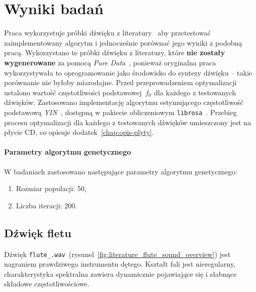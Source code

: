 \chapter{Wyniki badań}\label{chap:research}



Praca wykorzystuje próbki dźwięku z literatury~\cite{evolutionary_puredata_results}
aby przetestować zaimplementowany algorytm i jednocześnie porównać jego wyniki
z podobną pracą. Wykorzystano te próbki dźwięku
z literatury, które \textbf{nie zostały wygenerowane} za pomocą
\textit{Pure Data}~\cite{pure_data}, ponieważ oryginalna praca wykorzystywała
to oprogramowanie jako środowisko do syntezy dźwięku -- takie porównanie
nie byłoby miarodajne.
Przed przeprowadzeniem optymalizacji ustalono wartość częstotliwości podstawowej~$f_0$
dla każdego z testowanych dźwięków. Zastosowano implementację algorytmu
estymującego częstotliwość podstawową
\textit{YIN}~\cite{yin_pitch_estimation}, dostępną w pakiecie obliczeniowym
\texttt{librosa}~\cite{librosa}. Przebieg procesu optymalizacji dla każdego z testowanych
dźwięków umieszczony jest na płycie CD, co opisuje dodatek~\ref{chap:opis-plyty}.

\subsubsection{Parametry algorytmu genetycznego}

W badaniach zastosowano następujące parametry algorytmu genetycznego:

\begin{enumerate}
  \item Rozmiar populacji: 50,
  \item Liczba iteracji: 200.
\end{enumerate}

\section{Dźwięk fletu}

Dźwięk \texttt{flute\_.wav}~(rysunel~\ref{fig:literature_flute_sound_overview})
jest nagraniem prawdziwego instrumentu dętego. Kształt fali jest nieregularny,
charakterystyka spektralna zawiera dynamicznie pojawiające się i słabnące 
składowe częstotliwościowe.

